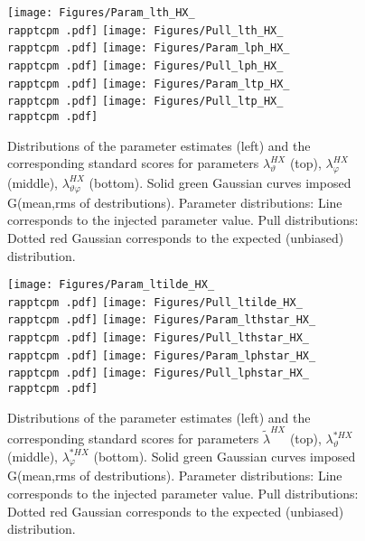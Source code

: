 \documentclass[12pt]{article}
\newcommand{\lamthHX}{\lambda^{\scriptscriptstyle HX}_\vartheta}
\newcommand{\lamphHX}{\lambda^{\scriptscriptstyle HX}_\varphi}
\newcommand{\lamthphHX}{\lambda^{\scriptscriptstyle HX}_{\vartheta \varphi}}
\newcommand{\lamtildeHX}{\tilde{\lambda}^{\scriptscriptstyle HX}}
\newcommand{\lamthstarHX}{\lambda^{* \scriptscriptstyle HX}_\vartheta}
\newcommand{\lamphstarHX}{\lambda^{* \scriptscriptstyle HX}_\varphi}
\providecommand{\rapptcpm}[1]{rap1pt1cpm1}%
\begin{document}
\begin{figure}[htbp]
\centering
\texttt{[image: Figures/Param\_lth\_HX\_\\rapptcpm .pdf]}
\texttt{[image: Figures/Pull\_lth\_HX\_\\rapptcpm .pdf]}
\texttt{[image: Figures/Param\_lph\_HX\_\\rapptcpm .pdf]}
\texttt{[image: Figures/Pull\_lph\_HX\_\\rapptcpm .pdf]}
\texttt{[image: Figures/Param\_ltp\_HX\_\\rapptcpm .pdf]}
\texttt{[image: Figures/Pull\_ltp\_HX\_\\rapptcpm .pdf]}
\caption{Distributions of the parameter estimates (left) and the corresponding
standard scores for parameters $\lamthHX$ (top), $\lamphHX$ (middle),
$\lamthphHX$ (bottom). Solid green Gaussian curves imposed G(mean,rms of
destributions). Parameter distributions: Line corresponds to the injected parameter value.
Pull distributions: Dotted red Gaussian corresponds to the expected
(unbiased) distribution.}
\end{figure}
\clearpage

\begin{figure}[htbp]
\centering
\texttt{[image: Figures/Param\_ltilde\_HX\_\\rapptcpm .pdf]}
\texttt{[image: Figures/Pull\_ltilde\_HX\_\\rapptcpm .pdf]}
\texttt{[image: Figures/Param\_lthstar\_HX\_\\rapptcpm .pdf]}
\texttt{[image: Figures/Pull\_lthstar\_HX\_\\rapptcpm .pdf]}
\texttt{[image: Figures/Param\_lphstar\_HX\_\\rapptcpm .pdf]}
\texttt{[image: Figures/Pull\_lphstar\_HX\_\\rapptcpm .pdf]}
\caption{Distributions of the parameter estimates (left) and the corresponding
standard scores for parameters $\lamtildeHX$ (top), $\lamthstarHX$ (middle),
$\lamphstarHX$ (bottom). Solid green Gaussian curves imposed G(mean,rms of
destributions). Parameter distributions: Line corresponds to the injected parameter value.
Pull distributions: Dotted red Gaussian corresponds to the expected
(unbiased) distribution.}
\end{figure}
\clearpage





\end{document}
